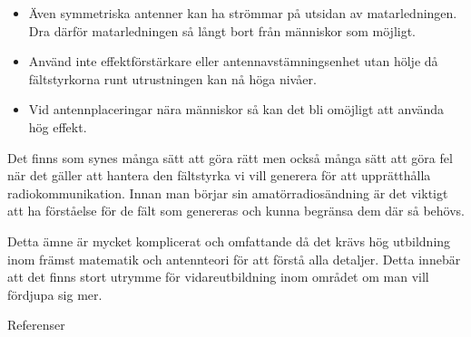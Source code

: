 \begin{itemize}
\item Även symmetriska antenner kan ha strömmar på utsidan av
matarledningen. Dra därför matarledningen så långt bort från människor
som möjligt.

\item Använd inte effektförstärkare eller antennavstämningsenhet utan
hölje då fältstyrkorna runt utrustningen kan nå höga nivåer.

\item Vid antennplaceringar nära människor så kan det bli omöjligt att
använda hög effekt.
\end{itemize}

Det finns som synes många sätt att göra rätt men också många sätt att
göra fel när det gäller att hantera den fältstyrka vi vill generera
för att upprätthålla radiokommunikation. Innan man börjar sin
amatörradiosändning är det viktigt att ha förståelse för de fält
som genereras och kunna begränsa dem där så behövs.

Detta ämne är mycket komplicerat och omfattande då det krävs hög
utbildning inom främst matematik och antennteori för att förstå alla
detaljer. Detta innebär att det finns stort utrymme för
vidareutbildning inom området om man vill fördjupa sig mer.

Referenser \cite{1999/519/EG} \cite{SSMFS2008:18} \cite{OETbul65b}
